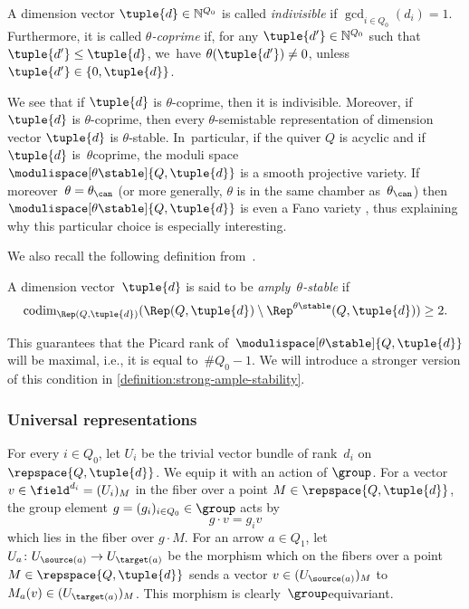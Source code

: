 \begin{definition}
A dimension vector $\tuple{d} \in \mathbb{N}^{Q_0}$ is called \emph{indivisible}
if $\gcd_{i \in Q_0}(d_i) = 1$.
Furthermore, it is called \emph{$\theta$-coprime} if,
for any $\tuple{d'} \in \mathbb{N}^{Q_0}$ such that $\tuple{d'} \leq \tuple{d}$, we~have $\theta(\tuple{d'}) \neq 0$,
unless $\tuple{d'} \in \{0,\tuple{d}\}$.
\end{definition}
We see that if $\tuple{d}$ is $\theta$-coprime, then it is indivisible.
Moreover, if $\tuple{d}$ is $\theta$-coprime,
then every $\theta$-semistable representation of dimension vector $\tuple{d}$ is $\theta$-stable. In~particular, if the quiver $Q$ is acyclic and if~$\tuple{d}$ is~$\theta$\dash coprime,
the moduli space~$\modulispace[\theta\stable]{Q,\tuple{d}}$ is a smooth projective variety.
If moreover~$\theta=\theta_\can$ (or more generally, $\theta$ is in the same chamber as~$\theta_\can$)
then~$\modulispace[\theta\stable]{Q,\tuple{d}}$ is even a Fano variety \cite{MR4352662},
thus explaining why this particular choice is especially interesting.

We also recall the following definition from~\cite[Def.\,4.1]{MR3683503}.
\begin{definition}
\label{definition:ample-stability}
A dimension vector~$\tuple{d}$ is said to be \emph{amply~$\theta$-stable} if
\begin{equation*}
\operatorname{codim}_{\Rep(Q,\tuple{d})}(\Rep(Q,\tuple{d})\setminus\Rep^{\theta\stable}(Q,\tuple{d}))\geq 2.
\end{equation*}
\end{definition}
This guarantees that the Picard rank of~$\modulispace[\theta\stable]{Q,\tuple{d}}$ will be maximal,
i.e., it is equal to~$\#Q_0-1$.
We will introduce a stronger version of this condition in \cref{definition:strong-ample-stability}.

\subsubsection*{Universal representations}
For every $i \in Q_0$,
let $U_i$ be the trivial vector bundle of rank~$d_i$ on $\repspace{Q,\tuple{d}}$.
We equip it with an action of $\group$.
For a vector $v \in \field^{d_i} = (U_i)_M$ in the fiber over a point $M \in \repspace{Q,\tuple{d}}$,
the group element $g=(g_i)_{i\in Q_0} \in \group$ acts by
\begin{equation*}
g \cdot v = g_iv
\end{equation*}
which lies in the fiber over $g\cdot M$.
For an arrow $a \in Q_1$,
let $U_a\colon U_{\source(a)} \to U_{\target(a)}$ be
the morphism which on the fibers over a point $M \in \repspace{Q,\tuple{d}}$
sends a vector $v \in (U_{\source(a)})_M$ to $M_a(v) \in (U_{\target(a)})_M$.
This morphism is clearly~$\group$\dash equivariant.

